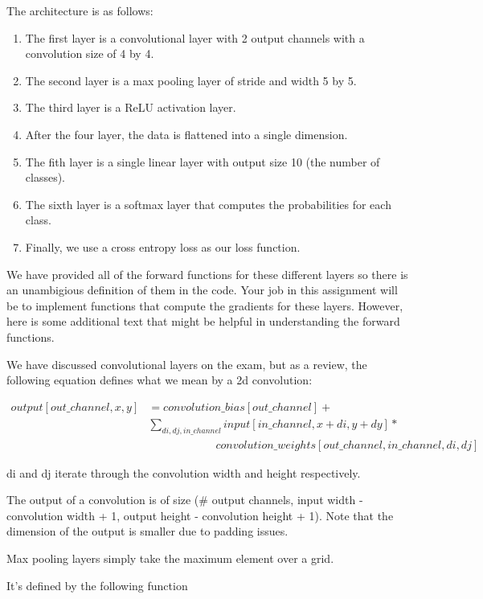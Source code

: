 The architecture is as follows:
\begin{enumerate}

    \item The first layer is a convolutional layer with 2 output channels with a convolution size of 4 by 4.
    \item  The second layer is a max pooling layer of stride and width 5 by 5.
    \item  The third layer is a ReLU activation layer.
    \item  After the four layer, the data is flattened into a single dimension.
    \item  The fith layer is a single linear layer with output size 10 (the number of classes).
    \item  The sixth layer is a softmax layer that computes the probabilities for each class.
    \item  Finally, we use a cross entropy loss as our loss function.
\end{enumerate}

We have provided all of the forward functions for these different layers so there is an unambigious definition of them in the code. Your job in this assignment will be to implement functions that compute the gradients for these layers. However, here is some additional text that might be helpful in understanding the forward functions.

We have discussed convolutional layers on the exam, but as a review, the following equation defines what we mean by a 2d convolution:

\begin{align*}
output[out\_channel, x, y] &=  convolution\_bias[out\_channel] + \\
    & \sum_{di, dj, in\_channel} input[in\_channel, x + di, y + dy] * \\
                   & \qquad \qquad \qquad convolution\_weights[out\_channel, in\_channel, di, dj]
\end{align*}

di and dj iterate through the convolution width and height respectively.

The output of a convolution is of size (\# output channels, input width - convolution width + 1, output height - convolution height + 1).
Note that the dimension of the output is smaller due to padding issues.

Max pooling layers simply take the maximum element over a grid.

It's defined by the following function

